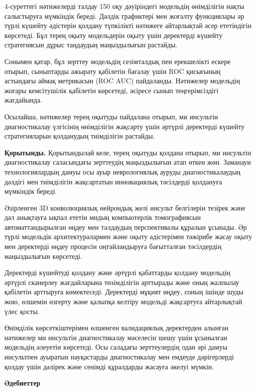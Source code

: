 \begin{multicols}{2}
4-суреттегі нәтижелерді талдау 150 оқу дәуіріндегі модельдің өнімділігін
нақты салыстыруға мүмкіндік береді. Дәлдік графиктері мен жоғалту
функциялары әр түрлі күшейту әдістерін қолдану түпкілікті нәтижеге
айтарлықтай әсер ететіндігін көрсетеді. Бұл терең оқыту модельдерін
оқыту үшін деректерді күшейту стратегиясын дұрыс таңдаудың маңыздылығын
растайды.

Сонымен қатар, бұл зерттеу модельдің сезімталдық пен ерекшелікті ескере
отырып, сыныптарды ажырату қабілетін бағалау үшін ROC қисығының
астындағы аймақ метрикасын (ROC AUC) пайдаланды. Нәтижелер модельдің
жоғары кемсітушілік қабілетін көрсетеді, әсіресе сынып теңгерімсіздігі
жағдайында.

Осылайша, нәтижелер терең оқытуды пайдалана отырып, ми инсультін
диагностикалау үлгісінің өнімділігін жақсарту үшін әртүрлі деректерді
күшейту стратегияларын қолданудың тиімділігін растайды.

{\bfseries Қорытынды.} Қорытындылай келе, терең оқытуды қолдана отырып, ми
инсультін диагностикалау саласындағы зерттеудің маңыздылығын атап өткен
жөн. Заманауи технологиялардың дамуы осы ауыр неврологиялық ауруды
диагностикалаудың дәлдігі мен тиімділігін жақсартатын инновациялық
тәсілдерді қолдануға мүмкіндік береді.

Әзірленген 3D конволюциялық нейрондық желі инсульт белгілерін тезірек
және дәл анықтауға ықпал ететін мидың компьютерлік томографиясын
автоматтандырылған өңдеу мен талдаудың перспективалы құралын ұсынады. Әр
түрлі модельдік архитектуралармен және оқыту әдістерімен тәжірибе жасау
оқыту мен деректерді өңдеу процесін оңтайландыруға бағытталған
тәсілдердің маңыздылығын көрсетеді.

Деректерді күшейтуді қолдану және әртүрлі қабаттарды қолдану модельдің
әртүрлі сканерлеу жағдайларына төзімділігін арттырады және оның жалпылау
қабілетін арттыруға көмектеседі. Деректерді мұқият өңдеу, соның ішінде
шуды жою, өлшемін өзгерту және қалыпқа келтіру модельді жақсартуға
айтарлықтай үлес қосты.

Өнімділік көрсеткіштерімен өлшенген валидациялық деректерден алынған
нәтижелер ми инсультін диагностикалау мәселесін шешу үшін ұсынылған
модельдің әлеуетін көрсетеді. Осы саладағы зерттеулердің одан әрі дамуы
инсультпен ауыратын науқастарды диагностикалау мен емдеуде дәрігерлерді
қолдау үшін дәлірек және сенімді құралдарды жасауға әкелуі мүмкін.
\end{multicols}
\newpage
\begin{center}
{\bfseries Әдебиеттер}
\end{center}

